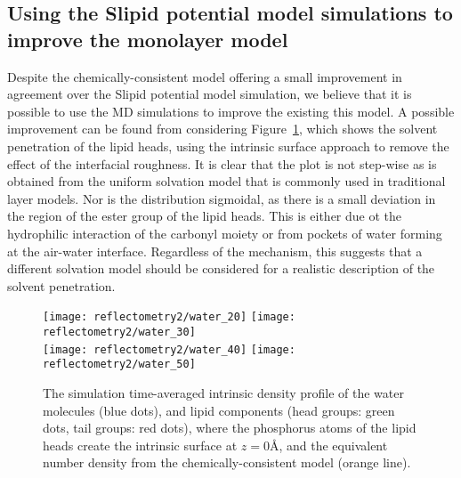 \subsection{Using the Slipid potential model simulations to improve the monolayer model}
Despite the chemically-consistent model offering a small improvement in agreement over the Slipid potential model simulation, we believe that it is possible to use the MD simulations to improve the existing this model.
A possible improvement can be found from considering Figure~\ref{fig:waters}, which shows the solvent penetration of the lipid heads, using the intrinsic surface approach to remove the effect of the interfacial roughness.
It is clear that the plot is not step-wise as is obtained from the uniform solvation model that is commonly used in traditional layer models.
Nor is the distribution sigmoidal, as there is a small deviation in the region of the ester group of the lipid heads.
This is either due ot the hydrophilic interaction of the carbonyl moiety or from pockets of water forming at the air-water interface.
Regardless of the mechanism, this suggests that a different solvation model should be considered for a realistic description of the solvent penetration.
%
\begin{figure}
    \centering
    \texttt{[image: reflectometry2/water\_20]}
    \texttt{[image: reflectometry2/water\_30]} \\
    \texttt{[image: reflectometry2/water\_40]}
    \texttt{[image: reflectometry2/water\_50]}
    \caption{The simulation time-averaged intrinsic density profile of the water molecules (blue dots), and lipid components (head groups: green dots, tail groups: red dots), where the phosphorus atoms of the lipid heads create the intrinsic surface at $z=0$\si{\angstrom}, and the equivalent number density from the chemically-consistent model (orange line).}
    \label{fig:waters}
\end{figure}
%

